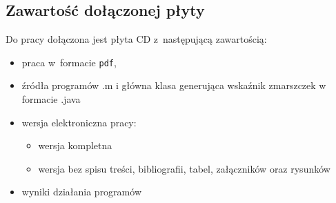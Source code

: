 \documentclass[a4paper,twoside,12pt]{book}
\begin{document}
\begin{appendices}
        \chapter*{Zawartość dołączonej płyty}

        Do pracy dołączona jest płyta CD z~następującą zawartością:
        \begin{itemize}
            \item praca w~formacie \texttt{pdf},
            \item źródła programów .m i główna klasa generująca wskaźnik zmarszczek w formacie .java
            \item wersja elektroniczna pracy:
            \begin{itemize}
                \item wersja kompletna
                \item wersja bez spisu treści, bibliografii, tabel, załączników oraz rysunków
            \end{itemize}
            \item wyniki działania programów
        \end{itemize}

        \listoffigures
        \listoftables

    \end{appendices}
\end{document}
